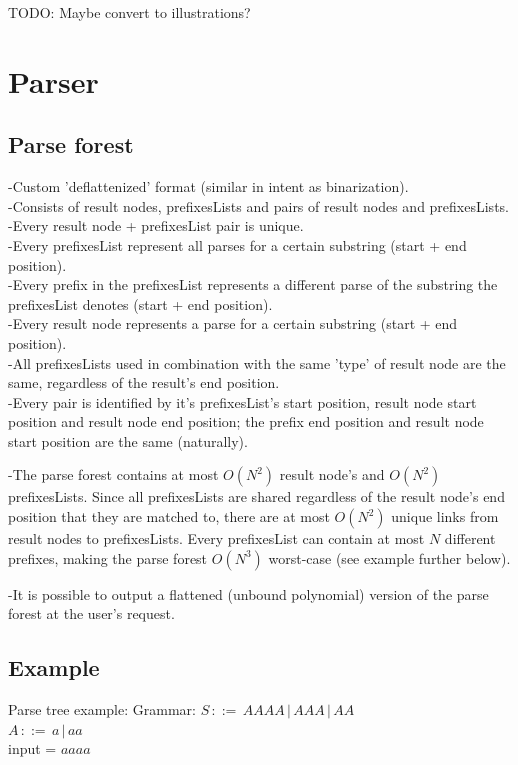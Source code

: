 \documentclass[a4paper,10pt]{article}
\begin{document}
TODO: Maybe convert to illustrations?

\section{Parser}

\subsection{Parse forest}

-Custom 'deflattenized' format (similar in intent as binarization).\\
-Consists of result nodes, prefixesLists and pairs of result nodes and prefixesLists.\\
-Every result node + prefixesList pair is unique.\\
-Every prefixesList represent all parses for a certain substring (start + end position).\\
-Every prefix in the prefixesList represents a different parse of the substring the prefixesList denotes (start + end position).\\
-Every result node represents a parse for a certain substring (start + end position).\\
-All prefixesLists used in combination with the same 'type' of result node are the same, regardless of the result's end position.\\
-Every pair is identified by it's prefixesList's start position, result node start position and result node end position; the prefix end position and result node start position are the same (naturally).

-The parse forest contains at most $O(N^{2})$ result node's and $O(N^{2})$ prefixesLists. Since all prefixesLists are shared regardless of the result node's end position that they are matched to, there are at most $O(N^{2})$ unique links from result nodes to prefixesLists. Every prefixesList can contain at most $N$ different prefixes, making the parse forest $O(N^{3})$ worst-case (see example further below).

-It is possible to output a flattened (unbound polynomial) version of the parse forest at the user's request.

\subsection{Example}

Parse tree example:
Grammar:
$S\,::=\,AAAA\,|\,AAA\,|\,AA$\\
$A\,::=\,a\,|\,aa$\\
input = $aaaa$
\end{document}
